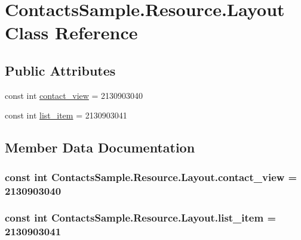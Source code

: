 \hypertarget{class_contacts_sample_1_1_resource_1_1_layout}{\section{Contacts\+Sample.\+Resource.\+Layout Class Reference}
\label{class_contacts_sample_1_1_resource_1_1_layout}
}
\subsection*{Public Attributes}
\begin{DoxyCompactItemize}
\item 
const int \hyperlink{class_contacts_sample_1_1_resource_1_1_layout_a9fbad1a9a3b0230a377d12f3f3ca42ab}{contact\+\_\+view} = 2130903040
\item 
const int \hyperlink{class_contacts_sample_1_1_resource_1_1_layout_a0206943ed25f86d581c83dc131e7cd70}{list\+\_\+item} = 2130903041
\end{DoxyCompactItemize}


\subsection{Member Data Documentation}
\hypertarget{class_contacts_sample_1_1_resource_1_1_layout_a9fbad1a9a3b0230a377d12f3f3ca42ab}{
\subsubsection[{contact\+\_\+view}]{\setlength{\rightskip}{0pt plus 5cm}const int Contacts\+Sample.\+Resource.\+Layout.\+contact\+\_\+view = 2130903040}}\label{class_contacts_sample_1_1_resource_1_1_layout_a9fbad1a9a3b0230a377d12f3f3ca42ab}
\hypertarget{class_contacts_sample_1_1_resource_1_1_layout_a0206943ed25f86d581c83dc131e7cd70}{
\subsubsection[{list\+\_\+item}]{\setlength{\rightskip}{0pt plus 5cm}const int Contacts\+Sample.\+Resource.\+Layout.\+list\+\_\+item = 2130903041}}\label{class_contacts_sample_1_1_resource_1_1_layout_a0206943ed25f86d581c83dc131e7cd70}


